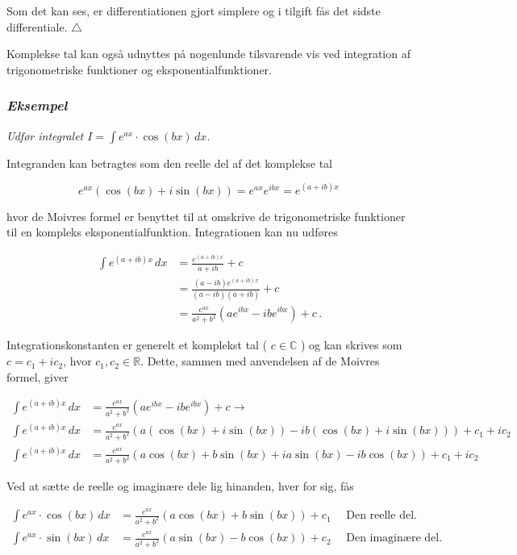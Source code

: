 \documentclass[a4paper, 12pt,titlepage]{article}
\begin{document}
Som det kan ses, er differentiationen gjort simplere og i tilgift fås det sidste differentiale. \(\triangle\)

Komplekse tal kan også udnyttes på nogenlunde tilsvarende vis ved integration af trigonometriske funktioner og eksponentialfunktioner.

\subsubsection*{\emph{Eksempel}}
\label{sec:org073fe82}
\emph{Udfør integralet \(I=\int e^{ax} \cdot \cos(bx) \,dx\).}

Integranden kan betragtes som den reelle del af det komplekse tal

$$e^{ax} \left(\cos(bx) + i \sin(bx)\right) =e^{ax} e^{ibx} = e^{(a+ib)x}\,$$

hvor de Moivres formel er benyttet til at omskrive de trigonometriske funktioner til en kompleks eksponentialfunktion. Integrationen kan nu udføres

\begin{align*}
    \int e^{(a+ib)x} \,dx &= \frac{e^{(a+ib)x}}{a+ib} + c \\
        &= \frac{(a-ib)e^{(a+ib)x}}{(a-ib)(a+ib)} + c\\
        &= \frac{e^{ax}}{a^2+b^2} \left(a e^{ibx} - i b e^{ibx} \right) + c\,.
\end{align*}

Integrationskonstanten er generelt et komplekst tal ( \(c \in \mathbb{C}\) ) og kan skrives som \(c=c_1 + i c_2\), hvor \(c_1, c_2 \in \mathbb{R}\). Dette, sammen med anvendelsen af de Moivres formel, giver

\begin{align*}
    \int e^{(a+ib)x} \,dx &= \frac{e^{ax}}{a^2+b^2} \left(a e^{ibx} - i b e^{ibx} \right) + c \to\\
     \int e^{(a+ib)x} \,dx &= \frac{e^{ax}}{a^2+b^2} \left(a \left(\cos(bx) + i \sin(bx)\right) - i b \left(\cos(bx) + i\sin(bx)\right) \right) + c_1 + i c_2 \\
     \int e^{(a+ib)x} \,dx &= \frac{e^{ax}}{a^2+b^2} \left(a \cos(bx) + b \sin(bx) + i a \sin(bx) - i b \cos(bx)  \right) + c_1 + i c_2 
 \end{align*}

Ved at sætte de reelle og imaginære dele lig hinanden, hver for sig, fås

\begin{align*}
    \int e^{ax} \cdot \cos(bx) \,dx &= \frac{e^{ax}}{a^2+b^2} \left( a \cos(bx) + b \sin(bx)\right) + c_1 \quad \text{ Den reelle del.} \\
    \int e^{ax} \cdot \sin(bx) \,dx &= \frac{e^{ax}}{a^2+b^2} \left( a \sin(bx) - b \cos(bx)\right) + c_2 \quad \text{ Den imaginære del.}
\end{align*}
\end{document}
